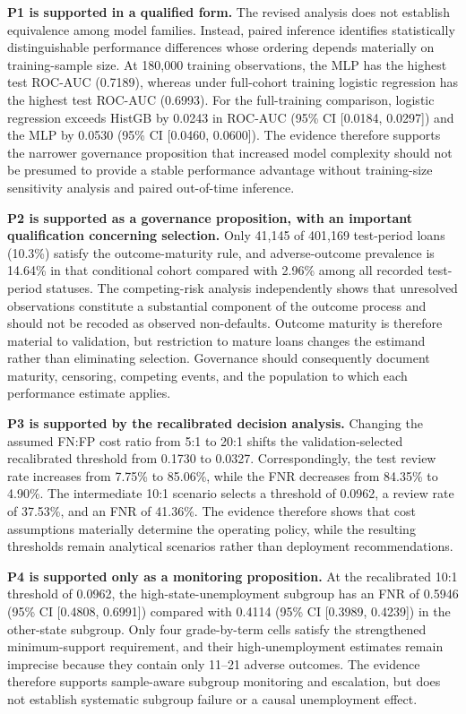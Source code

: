 \documentclass[10pt]{article}
\begin{document}
\textbf{P1 is supported in a qualified form.} The revised analysis does not establish equivalence among model families. Instead, paired inference identifies statistically distinguishable performance differences whose ordering depends materially on training-sample size. At 180,000 training observations, the MLP has the highest test ROC-AUC (0.7189), whereas under full-cohort training logistic regression has the highest test ROC-AUC (0.6993). For the full-training comparison, logistic regression exceeds HistGB by 0.0243 in ROC-AUC (95\% CI [0.0184, 0.0297]) and the MLP by 0.0530 (95\% CI [0.0460, 0.0600]). The evidence therefore supports the narrower governance proposition that increased model complexity should not be presumed to provide a stable performance advantage without training-size sensitivity analysis and paired out-of-time inference.

\textbf{P2 is supported as a governance proposition, with an important qualification concerning selection.} Only 41,145 of 401,169 test-period loans (10.3\%) satisfy the outcome-maturity rule, and adverse-outcome prevalence is 14.64\% in that conditional cohort compared with 2.96\% among all recorded test-period statuses. The competing-risk analysis independently shows that unresolved observations constitute a substantial component of the outcome process and should not be recoded as observed non-defaults. Outcome maturity is therefore material to validation, but restriction to mature loans changes the estimand rather than eliminating selection. Governance should consequently document maturity, censoring, competing events, and the population to which each performance estimate applies.

\textbf{P3 is supported by the recalibrated decision analysis.} Changing the assumed FN:FP cost ratio from 5:1 to 20:1 shifts the validation-selected recalibrated threshold from 0.1730 to 0.0327. Correspondingly, the test review rate increases from 7.75\% to 85.06\%, while the FNR decreases from 84.35\% to 4.90\%. The intermediate 10:1 scenario selects a threshold of 0.0962, a review rate of 37.53\%, and an FNR of 41.36\%. The evidence therefore shows that cost assumptions materially determine the operating policy, while the resulting thresholds remain analytical scenarios rather than deployment recommendations.

\textbf{P4 is supported only as a monitoring proposition.} At the recalibrated 10:1 threshold of 0.0962, the high-state-unemployment subgroup has an FNR of 0.5946 (95\% CI [0.4808, 0.6991]) compared with 0.4114 (95\% CI [0.3989, 0.4239]) in the other-state subgroup. Only four grade-by-term cells satisfy the strengthened minimum-support requirement, and their high-unemployment estimates remain imprecise because they contain only 11--21 adverse outcomes. The evidence therefore supports sample-aware subgroup monitoring and escalation, but does not establish systematic subgroup failure or a causal unemployment effect.
\end{document}
